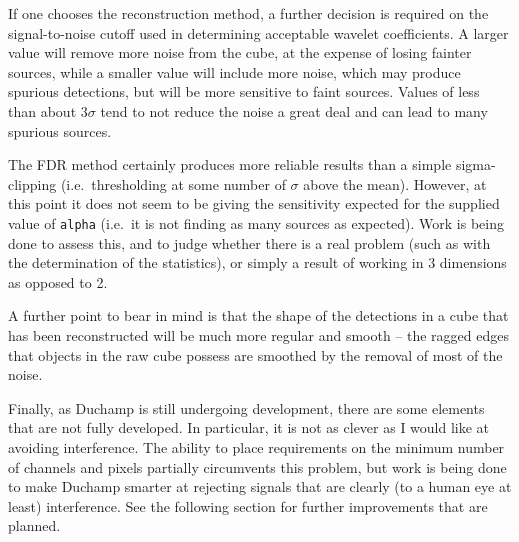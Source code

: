 \documentclass[12pt,a4paper]{article}
\newcommand{\ie}{i.e.\ }
\begin{document}
If one chooses the reconstruction method, a further decision is
required on the signal-to-noise cutoff used in determining acceptable
wavelet coefficients. A larger value will remove more noise from the
cube, at the expense of losing fainter sources, while a smaller value
will include more noise, which may produce spurious detections, but
will be more sensitive to faint sources. Values of less than about
$3\sigma$ tend to not reduce the noise a great deal and can lead to
many spurious sources.

The FDR method certainly produces more reliable results than a simple
sigma-clipping (\ie thresholding at some number of $\sigma$ above the
mean). However, at this point it does not seem to be giving the
sensitivity expected for the supplied value of {\tt alpha} (\ie it is
not finding as many sources as expected). Work is
being done to assess this, and to judge whether there is a real
problem (such as with the determination of the statistics), or simply
a result of working in 3 dimensions as opposed to 2.

A further point to bear in mind is that the shape of the detections in
a cube that has been reconstructed will be much more regular and
smooth -- the ragged edges that objects in the raw cube possess are
smoothed by the removal of most of the noise.

Finally, as Duchamp is still undergoing development, there are some
elements that are not fully developed. In particular, it is not as
clever as I would like at avoiding interference. The ability to place
requirements on the minimum number of channels and pixels partially
circumvents this problem, but work is being done to make Duchamp
smarter at rejecting signals that are clearly (to a human eye at
least) interference. See the following section for further
improvements that are planned.
\end{document}
